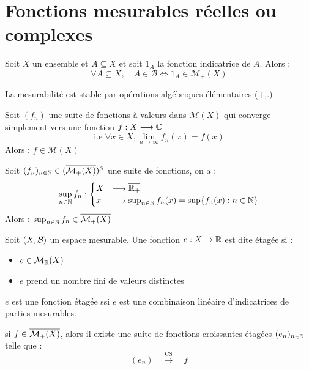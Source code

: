 
\section{Fonctions mesurables réelles ou complexes} 

\begin{prop} 
	Soit $X$ un ensemble et $A \subseteq X$ et soit $1_A$ la fonction indicatrice de $A$.
Alors : 
		\[ \forall A \subseteq X, \quad A \in \mathcal{B} \Longleftrightarrow 1_A \in \mathcal{M}_+(X) \] 
\end{prop} 

\begin{theorem}[Stabilité]
	La mesurabilité est stable par opérations algébriques élémentaires (+,.).
\end{theorem} 

\begin{theorem}
	Soit $(f_n)$ une suite de fonctions à valeurs dans $\mathcal{M}(X)$ qui converge simplement vers une fonction $f : X \longrightarrow \mathbb{C}$ 
		\[ \text{i.e } \forall x \in X, \lim_{n\to\infty} f_n(x) = f(x) \]
Alors : $f \in \mathcal{M}(X)$ 
\end{theorem} 

\begin{theorem}
	Soit $(f_n)_{n\in\mathbb{N}} \in (\overline{\mathcal{M}_+(X)})^{\mathbb{N}}$ une suite de fonctions, on a :
	\[ \sup_{n\in\mathbb{N}} f_n : 
		\begin{cases}
			X &\longrightarrow \overline{\mathbb{R}_+} \\
			x &\longmapsto \sup_{n\in\mathbb{N}} f_n(x) = \sup \{ f_n(x) : n \in \mathbb{N} \}
		\end{cases} \]
Alors :  $\sup_{n\in\mathbb{N}} f_n \in \overline{\mathcal{M}_+(X)}$
\end{theorem}

\begin{definition}
	Soit $(X,\mathcal{B})$ un espace mesurable. Une fonction $e : X \rightarrow \mathbb{R}$ est dite étagée si :
		\begin{itemize}
			\item $e \in \mathcal{M}_{\mathbb{R}}(X)$
			\item $e$ prend un nombre fini de valeurs distinctes 
		\end{itemize}
\end{definition}

\begin{prop}
	$e$ est une fonction étagée ssi $e$ est une combinaison linéaire d'indicatrices de parties mesurables.
\end{prop}

\begin{theorem}
	si $f \in \overline{\mathcal{M}_+(X)}$, alors il existe une suite de fonctions croissantes étagées $(e_n)_{n\in\mathbb{N}}$ telle que :
		\[ \boxed{ (e_n) \quad \overset{\text{CS}}{\longrightarrow} \quad f} \] 
\end{theorem}
